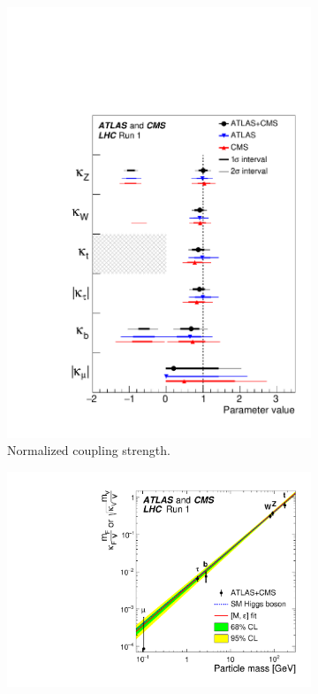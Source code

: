 \begin{figure}[htb]
    \centering
    \begin{subfigure}[c]{0.45\textwidth}
        \includegraphics[width=\textwidth]{./figures/theory/coupling_strength.pdf}
        \caption{Normalized coupling strength.}\label{fig:theory:meas:run1:kappanorm}
    \end{subfigure}
    \begin{subfigure}[c]{0.45\textwidth}
        \includegraphics[width=\textwidth]{./figures/theory/reduced_coupling_strength.pdf}

\end{subfigure}
\end{figure}
